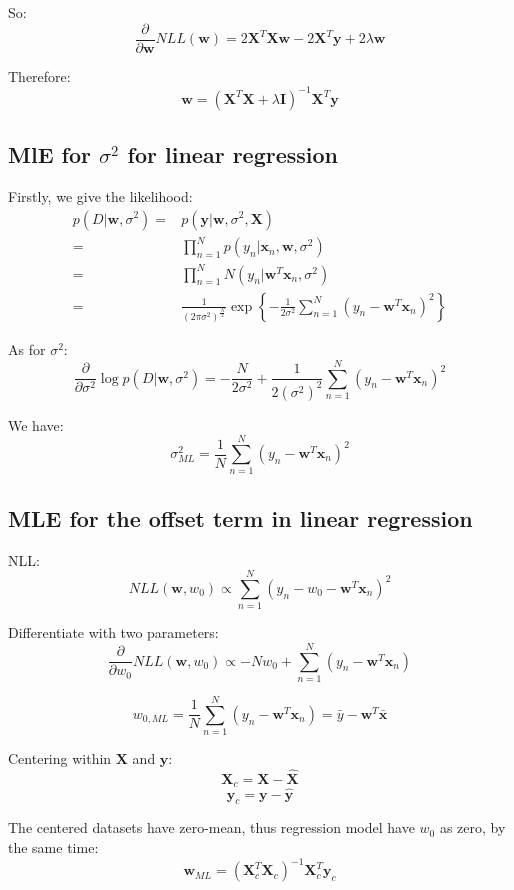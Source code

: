 \documentclass[UTF8]{ctexart}
\begin{document}
So:
$$\frac{\partial}{\partial \textbf{w}}NLL(\textbf{w})=2\textbf{X}^{T}\textbf{X}\textbf{w}-2\textbf{X}^{T}\textbf{y}+2\lambda \textbf{w}$$

Therefore:
$$\textbf{w}=(\textbf{X}^{T}\textbf{X}+\lambda \textbf{I})^{-1}\textbf{X}^{T}\textbf{y}$$

\subsection{MlE for $\sigma^{2}$ for linear regression}
Firstly, we give the likelihood:
\begin{align}
p(D|\textbf{w},\sigma^{2})=&p(\textbf{y}|\textbf{w},\sigma^{2},\textbf{X})\nonumber \\
=&\prod_{n=1}^{N}p(y_{n}|\textbf{x}_{n},\textbf{w},\sigma^{2})\nonumber \\
=&\prod_{n=1}^{N}N(y_{n}|\textbf{w}^{T}\textbf{x}_{n},\sigma^{2})\nonumber \\
=&\frac{1}{(2\pi\sigma^{2})^{\frac{N}{2}}}\exp\left\{ -\frac{1}{2\sigma^{2}}\sum_{n=1}^{N}(y_{n}-\textbf{w}^{T}\textbf{x}_{n})^{2} \right\}\nonumber
\end{align}

As for $\sigma^{2}$:
$$\frac{\partial}{\partial \sigma^{2}}\log p(D|\textbf{w},\sigma^{2}) = -\frac{N}{2\sigma^{2}}+\frac{1}{2(\sigma^{2})^{2}}\sum_{n=1}^{N}(y_{n}-\textbf{w}^{T}\textbf{x}_{n})^{2}$$

We have:
$$\sigma^{2}_{ML}=\frac{1}{N}\sum_{n=1}^{N}(y_{n}-\textbf{w}^{T}\textbf{x}_{n})^{2}$$

\subsection{MLE for the offset term in linear regression}
NLL:
$$NLL(\textbf{w},w_{0})\propto \sum_{n=1}^{N}(y_{n}-w_{0}-\textbf{w}^{T}\textbf{x}_{n})^{2}$$

Differentiate with two parameters:
$$\frac{\partial}{\partial w_{0}}NLL(\textbf{w},w_{0}) \propto -Nw_{0} +\sum_{n=1}^{N}(y_{n}-\textbf{w}^{T}\textbf{x}_{n})$$

$$w_{0,ML}=\frac{1}{N} \sum_{n=1}^{N}(y_{n}-\textbf{w}^{T}\textbf{x}_{n})=\bar{y}-\textbf{w}^{T}\bar{\textbf{x}}$$

Centering within $\textbf{X}$ and $\textbf{y}$:
$$\textbf{X}_{c}=\textbf{X}-\hat{\textbf{X}}$$
$$\textbf{y}_{c}=\textbf{y}-\hat{\textbf{y}}$$

The centered datasets have zero-mean, thus regression model have $w_{0}$ as zero, by the same time:
$$\textbf{w}_{ML}=(\textbf{X}_{c}^{T}\textbf{X}_{c})^{-1}\textbf{X}_{c}^{T}\textbf{y}_{c}$$
\end{document}
